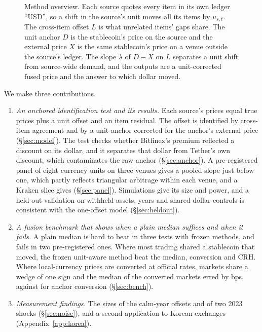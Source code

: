 \documentclass[sigconf,review,anonymous]{acmart}
\begin{document}
\begin{figure}[t]
\centering
\resizebox{\textwidth}{!}{}
\caption{Method overview. Each source quotes every item in its own ledger ``USD'', so a shift in the source's unit moves all its items by $u_{s,t}$. The cross-item offset $L$ is what unrelated items' gaps share. The unit anchor $D$ is the stablecoin's price on the source and the external price $X$ is the same stablecoin's price on a venue outside the source's ledger. The slope $\lambda$ of $D-X$ on $L$ separates a unit shift from source-wide demand, and the outputs are a unit-corrected fused price and the answer to which dollar moved.}
\label{fig:overview}
\end{figure}

We make three contributions.
\begin{enumerate}
\item \emph{An anchored identification test and its results.} Each source's prices equal true prices plus a unit offset and an
item residual. The offset is identified by cross-item agreement and by a unit anchor corrected for the anchor's external price
(\S\ref{sec:model}). The test checks whether Bitfinex's premium reflected a discount on its dollar, and it separates that
dollar from Tether's own discount, which contaminates the raw anchor (\S\ref{sec:anchor}). A pre-registered panel of eight
currency units on three venues gives a pooled slope just below one, which partly reflects triangular arbitrage within each
venue, and a Kraken slice gives \NumPKPooledStressLam{} (\S\ref{sec:panel}). Simulations give its size and power,
and a held-out validation on withheld assets, years and shared-dollar controls is consistent with the one-offset model
(\S\ref{sec:heldout}).
\item \emph{A fusion benchmark that shows when a plain median suffices and when it fails.} A plain median is hard to beat in three tests with
frozen methods, and fails in two pre-registered ones. Where most trading shared a
stablecoin that moved, the frozen unit-aware method beat the median, conversion and CRH. Where local-currency prices are converted at official rates, markets share a wedge of one sign and the
median of the converted markets erred by \NumPFFusMOMae{} bps, against \NumPFFusMAMae{} for anchor conversion (\S\ref{sec:bench}).
\item \emph{Measurement findings.} The sizes of the calm-year offsets and of two 2023 shocks (\S\ref{sec:noise}), and a
second application to Korean exchanges (Appendix~\ref{app:korea}).
\end{enumerate}
\end{document}
